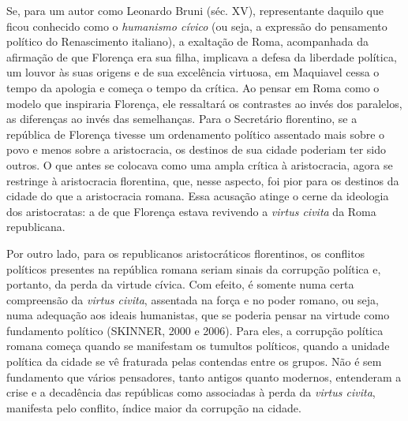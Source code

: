 Se, para um autor como Leonardo Bruni (séc. XV), representante daquilo
que ficou conhecido como o \emph{humanismo cívico} (ou seja, a expressão
do pensamento político do Renascimento italiano), a exaltação de Roma,
acompanhada da afirmação de que Florença era sua filha, implicava a
defesa da liberdade política, um louvor às suas origens e de sua
excelência virtuosa, em Maquiavel cessa o tempo da apologia e começa o
tempo da crítica. Ao pensar em Roma como o modelo que inspiraria
Florença, ele ressaltará os contrastes ao invés dos paralelos, as
diferenças ao invés das semelhanças. Para o Secretário florentino, se a
república de Florença tivesse um ordenamento político assentado mais
sobre o povo e menos sobre a aristocracia, os destinos de sua cidade
poderiam ter sido outros. O que antes se colocava como uma ampla crítica
à aristocracia, agora se restringe à aristocracia florentina, que, nesse
aspecto, foi pior para os destinos da cidade do que a aristocracia
romana. Essa acusação atinge o cerne da ideologia dos aristocratas: a de
que Florença estava revivendo a \emph{virtus civita} da Roma
republicana.

Por outro lado, para os republicanos aristocráticos florentinos, os
conflitos políticos presentes na república romana seriam sinais da
corrupção política e, portanto, da perda da virtude cívica. Com efeito,
é somente numa certa compreensão da \emph{virtus civita}, assentada na
força e no poder romano, ou seja, numa adequação aos ideais humanistas,
que se poderia pensar na virtude como fundamento político (SKINNER, 2000
e 2006). Para eles, a corrupção política romana começa quando se
manifestam os tumultos políticos, quando a unidade política da cidade se
vê fraturada pelas contendas entre os grupos. Não é sem fundamento que
vários pensadores, tanto antigos quanto modernos, entenderam a crise e a
decadência das repúblicas como associadas à perda da \emph{virtus
civita}, manifesta pelo conflito, índice maior da corrupção na cidade.

